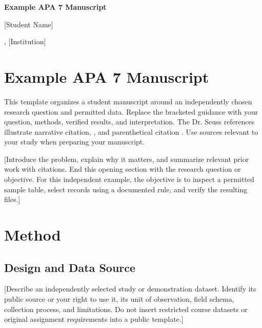 \documentclass[12pt,letterpaper]{article}
\newcommand{\papertitle}{Example APA 7 Manuscript}
\newcommand{\studentname}{[Student Name]}
\newcommand{\affiliation}{[Department or Program], [Institution]}
\newcommand{\coursename}{[Course Name]}
\newcommand{\instructorname}{[Instructor Name]}
\newcommand{\duedate}{[Month Day, Year]}
\newif\ifincludeabstract
\begin{document}
\begin{center}
\vspace*{2\baselineskip}
\textbf{\papertitle}\par
\vspace{\baselineskip}
\studentname\par
\affiliation\par
\coursename\par
\instructorname\par
\duedate\par
\end{center}
\newpage

\ifincludeabstract
\section*{Abstract}
\noindent [Write one unindented paragraph summarizing the purpose, design,
data, methods, principal results, and conclusion. Use the word limit assigned
by the instructor. Replace this instruction only after verifying the results.]
\par\noindent\textit{Keywords:} [term one], [term two], [term three]
\newpage
\fi

\section*{\papertitle}
This template organizes a student manuscript around an independently chosen
research question and permitted data. Replace the bracketed guidance
with your question, methods, verified results, and interpretation. The
Dr. Seuss references illustrate narrative citation, \textcite{seuss1957cat},
and parenthetical citation \parencite{seuss1971lorax}. Use sources relevant
to your study when preparing your manuscript.

[Introduce the problem, explain why it matters, and summarize relevant prior
work with citations. End this opening section with the research question or
objective. For this independent example, the objective is to inspect a permitted sample table,
select records using a documented rule, and verify the resulting files.]

\section{Method}
\subsection{Design and Data Source}
[Describe an independently selected study or demonstration dataset. Identify
its public source or your right to use it, its unit of observation, field
schema, collection process, and limitations. Do not insert restricted course
datasets or original assignment requirements into a public template.]
\end{document}
